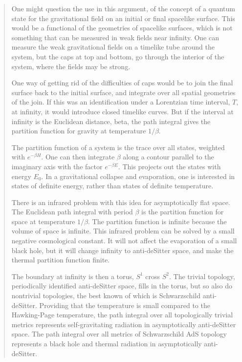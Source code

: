 \documentclass{article}
\begin{document}
\begin{quote}
One might question the use in this argument, of the concept of a quantum
state for the gravitational field on an initial or final spacelike
surface. This would be a functional of the geometries of spacelike
surfaces, which is not something that can be measured in weak fields
near infinity. One can measure the weak gravitational fields on a
timelike tube around the system, but the caps at top and bottom, go
through the interior of the system, where the fields may be strong.

One way of getting rid of the difficulties of caps would be to join the
final surface back to the initial surface, and integrate over all
spatial geometries of the join. If this was an identification under a
Lorentzian time interval, \(T\), at infinity, it would introduce closed
timelike curves. But if the interval at infinity is the Euclidean
distance, beta, the path integral gives the partition function for
gravity at temperature \(1/\beta\).

The partition function of a system is the trace over all states,
weighted with \(e^{-\beta H}\). One can then integrate \(\beta\) along a
contour parallel to the imaginary axis with the factor \(e^{-\beta E}\).
This projects out the states with energy \(E_0\). In a gravitational
collapse and evaporation, one is interested in states of definite
energy, rather than states of definite temperature.

There is an infrared problem with this idea for asymptotically flat
space. The Euclidean path integral with period \(\beta\) is the
partition function for space at temperature \(1/\beta\). The partition
function is infinite because the volume of space is infinite. This
infrared problem can be solved by a small negative cosmological
constant. It will not affect the evaporation of a small black hole, but
it will change infinity to anti-deSitter space, and make the thermal
partition function finite.

The boundary at infinity is then a torus, \(S^1\) cross \(S^2\). The
trivial topology, periodically identified anti-deSitter space, fills in
the torus, but so also do nontrivial topologies, the best known of which
is Schwarzschild anti-deSitter. Providing that the temperature is small
compared to the Hawking-Page temperature, the path integral over all
topologically trivial metrics represents self-gravitating radiation in
asymptotically anti-deSitter space. The path integral over all metrics
of Schwarzschild AdS topology represents a black hole and thermal
radiation in asymptotically anti-deSitter.


\end{quote}
\end{document}
